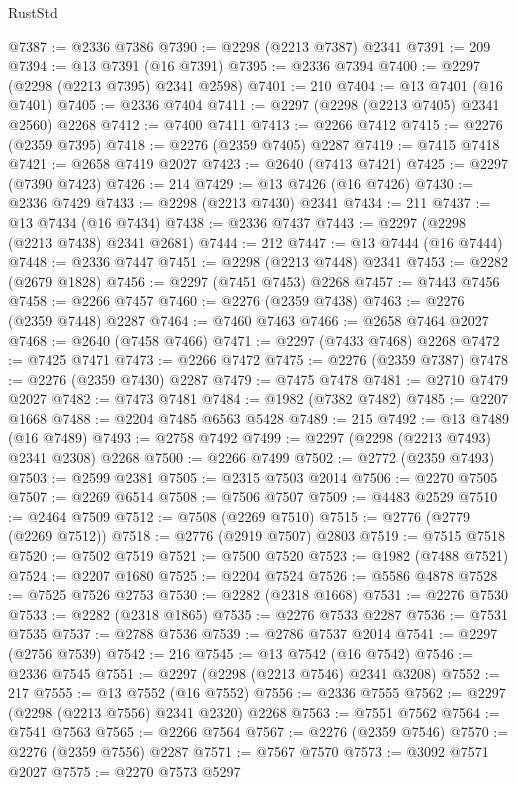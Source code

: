 \begin{lexlean}{RustStd}
\begin{coremodule}
@7387 := @2336 @7386
@7390 := @2298 (@2213 @7387) @2341
@7391 := 209
@7394 := @13 @7391 (@16 @7391)
@7395 := @2336 @7394
@7400 := @2297 (@2298 (@2213 @7395) @2341 @2598)
@7401 := 210
@7404 := @13 @7401 (@16 @7401)
@7405 := @2336 @7404
@7411 := @2297 (@2298 (@2213 @7405) @2341 @2560) @2268
@7412 := @7400 @7411
@7413 := @2266 @7412
@7415 := @2276 (@2359 @7395)
@7418 := @2276 (@2359 @7405) @2287
@7419 := @7415 @7418
@7421 := @2658 @7419 @2027
@7423 := @2640 (@7413 @7421)
@7425 := @2297 (@7390 @7423)
@7426 := 214
@7429 := @13 @7426 (@16 @7426)
@7430 := @2336 @7429
@7433 := @2298 (@2213 @7430) @2341
@7434 := 211
@7437 := @13 @7434 (@16 @7434)
@7438 := @2336 @7437
@7443 := @2297 (@2298 (@2213 @7438) @2341 @2681)
@7444 := 212
@7447 := @13 @7444 (@16 @7444)
@7448 := @2336 @7447
@7451 := @2298 (@2213 @7448) @2341
@7453 := @2282 (@2679 @1828)
@7456 := @2297 (@7451 @7453) @2268
@7457 := @7443 @7456
@7458 := @2266 @7457
@7460 := @2276 (@2359 @7438)
@7463 := @2276 (@2359 @7448) @2287
@7464 := @7460 @7463
@7466 := @2658 @7464 @2027
@7468 := @2640 (@7458 @7466)
@7471 := @2297 (@7433 @7468) @2268
@7472 := @7425 @7471
@7473 := @2266 @7472
@7475 := @2276 (@2359 @7387)
@7478 := @2276 (@2359 @7430) @2287
@7479 := @7475 @7478
@7481 := @2710 @7479 @2027
@7482 := @7473 @7481
@7484 := @1982 (@7382 @7482)
@7485 := @2207 @1668
@7488 := @2204 @7485 @6563 @5428
@7489 := 215
@7492 := @13 @7489 (@16 @7489)
@7493 := @2758 @7492
@7499 := @2297 (@2298 (@2213 @7493) @2341 @2308) @2268
@7500 := @2266 @7499
@7502 := @2772 (@2359 @7493)
@7503 := @2599 @2381
@7505 := @2315 @7503 @2014
@7506 := @2270 @7505
@7507 := @2269 @6514
@7508 := @7506 @7507
@7509 := @4483 @2529
@7510 := @2464 @7509
@7512 := @7508 (@2269 @7510)
@7515 := @2776 (@2779 (@2269 @7512))
@7518 := @2776 (@2919 @7507) @2803
@7519 := @7515 @7518
@7520 := @7502 @7519
@7521 := @7500 @7520
@7523 := @1982 (@7488 @7521)
@7524 := @2207 @1680
@7525 := @2204 @7524
@7526 := @5586 @4878
@7528 := @7525 @7526 @2753
@7530 := @2282 (@2318 @1668)
@7531 := @2276 @7530
@7533 := @2282 (@2318 @1865)
@7535 := @2276 @7533 @2287
@7536 := @7531 @7535
@7537 := @2788 @7536
@7539 := @2786 @7537 @2014
@7541 := @2297 (@2756 @7539)
@7542 := 216
@7545 := @13 @7542 (@16 @7542)
@7546 := @2336 @7545
@7551 := @2297 (@2298 (@2213 @7546) @2341 @3208)
@7552 := 217
@7555 := @13 @7552 (@16 @7552)
@7556 := @2336 @7555
@7562 := @2297 (@2298 (@2213 @7556) @2341 @2320) @2268
@7563 := @7551 @7562
@7564 := @7541 @7563
@7565 := @2266 @7564
@7567 := @2276 (@2359 @7546)
@7570 := @2276 (@2359 @7556) @2287
@7571 := @7567 @7570
@7573 := @3092 @7571 @2027
@7575 := @2270 @7573 @5297

\end{coremodule}
\end{lexlean}
